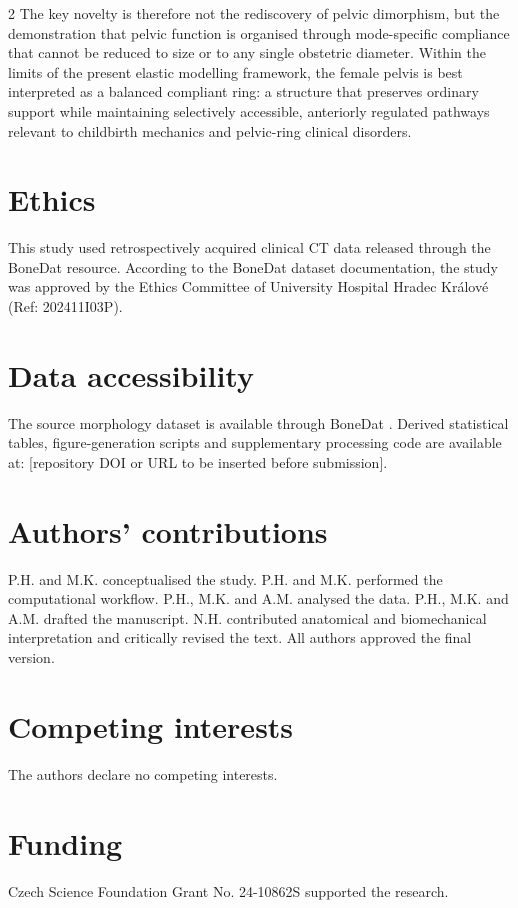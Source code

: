 \documentclass[openacc]{rsproca_new}
\begin{document}
\begin{multicols}{2}
The key novelty is therefore not the rediscovery of pelvic dimorphism, but the demonstration that pelvic function is organised through mode-specific compliance that cannot be reduced to size or to any single obstetric diameter. Within the limits of the present elastic modelling framework, the female pelvis is best interpreted as a balanced compliant ring: a structure that preserves ordinary support while maintaining selectively accessible, anteriorly regulated pathways relevant to childbirth mechanics and pelvic-ring clinical disorders.

\section*{Ethics}

This study used retrospectively acquired clinical CT data released through the BoneDat resource. According to the BoneDat dataset documentation, the study was approved by the Ethics Committee of University Hospital Hradec Kr\'{a}lov\'{e} (Ref: 202411I03P).

\section*{Data accessibility}

The source morphology dataset is available through BoneDat \cite{HenysKuchar2025}. Derived statistical tables, figure-generation scripts and supplementary processing code are available at: [repository DOI or URL to be inserted before submission].

\section*{Authors' contributions}

P.H. and M.K. conceptualised the study. P.H. and M.K. performed the computational workflow. P.H., M.K. and A.M. analysed the data. P.H., M.K. and A.M. drafted the manuscript. N.H. contributed anatomical and biomechanical interpretation and critically revised the text. All authors approved the final version.

\section*{Competing interests}

The authors declare no competing interests.

\section*{Funding}
Czech Science Foundation Grant No. 24-10862S supported the research.
\end{multicols}
\end{document}
